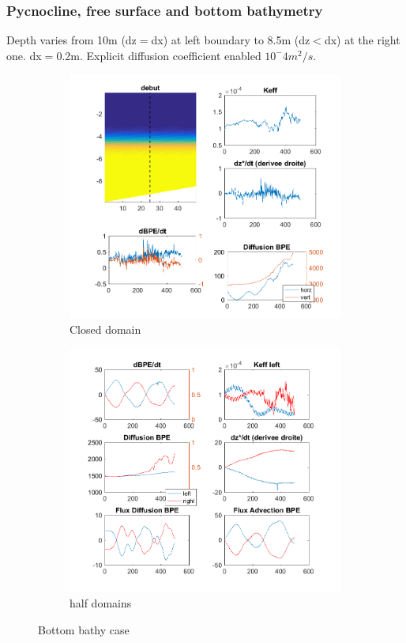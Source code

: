 \subsubsection{Pycnocline, free surface and bottom bathymetry}

Depth varies from 10m (dz$=$dx) at left boundary to 8.5m (dz$<$dx) at the right one. dx$=$0.2m. Explicit diffusion coefficient enabled $10^-4m^2/s$.

\begin{figure}[h!]

\begin{subfigure}{.5\textwidth}
\includegraphics[width=1.\textwidth]{./CHAP_BPE/AGBPE_numlab9_all.png}
\caption{Closed domain}
\end{subfigure}
%
\begin{subfigure}{.5\textwidth}
\includegraphics[width=1.\textwidth]{./CHAP_BPE/AGBPE_numlab9_halves.png}
\caption{half domains}
\end{subfigure}
\caption{Bottom bathy case}
\end{figure}

